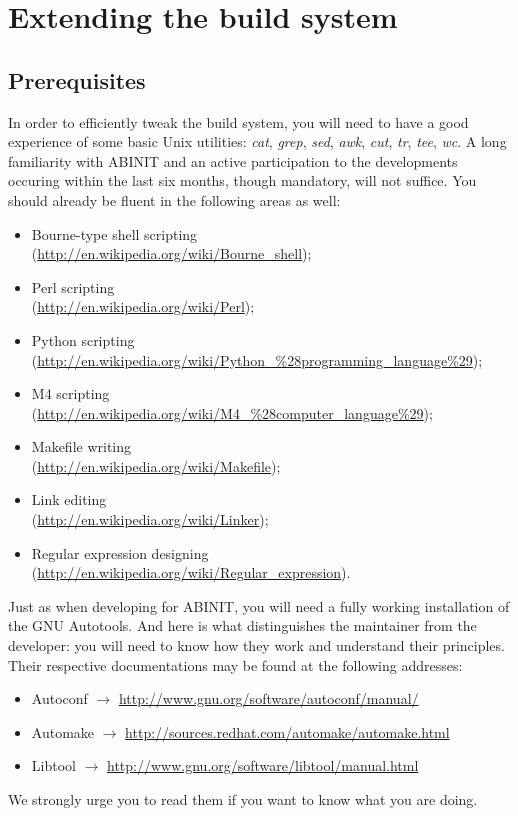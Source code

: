 \chapter{Extending the build system}

\section{Prerequisites}

In order to efficiently tweak the build system, you will need to have a
good experience of some basic Unix utilities: \textit{cat}, \textit{grep},
\textit{sed}, \textit{awk}, \textit{cut}, \textit{tr}, \textit{tee},
\textit{wc}. A long familiarity with ABINIT and an active participation
to the developments occuring within the last six months, though
mandatory, will not suffice. You should already be fluent in the
following areas as well:
\begin{itemize}
 \item
 Bourne-type shell scripting \\
 (\url{http://en.wikipedia.org/wiki/Bourne_shell});
 \item
 Perl scripting \\
 (\url{http://en.wikipedia.org/wiki/Perl});
 \item
 Python scripting \\
 {\small
 (\url{http://en.wikipedia.org/wiki/Python_%28programming_language%29});
 }
 \item
 M4 scripting \\
 (\url{http://en.wikipedia.org/wiki/M4_%28computer_language%29});
 \item
 Makefile writing \\
 (\url{http://en.wikipedia.org/wiki/Makefile});
 \item
 Link editing \\
 (\url{http://en.wikipedia.org/wiki/Linker});
 \item
 Regular expression designing \\
 (\url{http://en.wikipedia.org/wiki/Regular_expression}).
\end{itemize}

Just as when developing for ABINIT, you will need a fully working
installation of the GNU Autotools. And here is what distinguishes the
maintainer from the developer: you will need to know how they work and
understand their principles. Their respective documentations may be
found at the following addresses:
\begin{itemize}
 \item
 Autoconf 
 $\longrightarrow$ \url{http://www.gnu.org/software/autoconf/manual/}
 \item
 Automake
 $\longrightarrow$ \url{http://sources.redhat.com/automake/automake.html}
 \item
 Libtool
 $\longrightarrow$ \url{http://www.gnu.org/software/libtool/manual.html}
\end{itemize}
We strongly urge you to read them if you want to know what you are
doing.
\\

